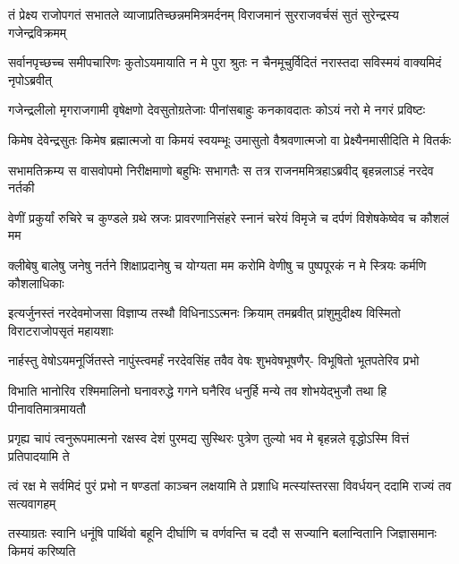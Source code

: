 \fourlineindentedshloka
{तं प्रेक्ष्य राजोपगतं सभातले}
{व्याजाप्रतिच्छन्नममित्रमर्दनम्}
{विराजमानं सुरराजवर्चसं}
{सुतं सुरेन्द्रस्य गजेन्द्रविक्रमम्}


\fourlineindentedshloka
{सर्वानपृच्छच्च समीपचारिणः}
{कुतोऽयमायाति न मे पुरा श्रुतः}
{न चैनमूचुर्विदितं नरास्तदा}
{सविस्मयं वाक्यमिदं नृपोऽब्रवीत्}




\fourlineindentedshloka
{गजेन्द्रलीलो मृगराजगामी}
{वृषेक्षणो देवसुतोग्रतेजाः}
{पीनांसबाहुः कनकावदातः}
{कोऽयं नरो मे नगरं प्रविष्टः}


\fourlineindentedshloka
{किमेष देवेन्द्रसुतः किमेष}
{ब्रह्मात्मजो वा किमयं स्वयम्भूः}
{उमासुतो वैश्रवणात्मजो वा}
{प्रेक्ष्यैनमासीदिति मे वितर्कः}



\fourlineindentedshloka
{सभामतिक्रम्य स वासवोपमो}
{निरीक्षमाणो बहुभिः सभागतैः}
{स तत्र राजनममित्रहाऽब्रवीद्}
{बृहन्नलाऽहं नरदेव नर्तकी}


\fourlineindentedshloka
{वेणीं प्रकुर्यां रुचिरे च कुण्डले}
{ग्रथे स्रजः प्रावरणानिसंहरे}
{स्नानं चरेयं विमृजे च दर्पणं}
{विशेषकेष्वेव च कौशलं मम}


\fourlineindentedshloka
{क्लीबेषु बालेषु जनेषु नर्तने}
{शिक्षाप्रदानेषु च योग्यता मम}
{करोमि वेणीषु च पुष्पपूरकं}
{न मे स्त्रियः कर्मणि कौशलाधिकाः}


\fourlineindentedshloka
{इत्यर्जुनस्तं नरदेवमोजसा}
{विज्ञाप्य तस्थौ विधिनाऽऽत्मनः क्रियाम्}
{तमब्रवीत् प्रांशुमुदीक्ष्य विस्मितो}
{विराटराजोपसृतं महायशाः}


\fourlineindentedshloka
{नार्हस्तु वेषोऽयमनूर्जितस्ते}
{नापुंस्त्वमर्हं नरदेवसिंह}
{तवैव वेषः शुभवेषभूषणैर्-}
{विभूषितो भूतपतेरिव प्रभो}


\fourlineindentedshloka
{विभाति भानोरिव रश्मिमालिनो}
{घनावरुद्धे गगने घनैरिव}
{धनुर्हि मन्ये तव शोभयेद्भुजौ}
{तथा हि पीनावतिमात्रमायतौ}


\fourlineindentedshloka
{प्रगृह्य चापं त्वनुरूपमात्मनो}
{रक्षस्व देशं पुरमद्य सुस्थिरः}
{पुत्रेण तुल्यो भव मे बृहन्नले}
{वृद्धोऽस्मि वित्तं प्रतिपादयामि ते}


\fourlineindentedshloka
{त्वं रक्ष मे सर्वमिदं पुरं प्रभो}
{न षण्डतां काञ्चन लक्षयामि ते}
{प्रशाधि मत्स्यांस्तरसा विवर्धयन्}
{ददामि राज्यं तव सत्यवागहम्}



\fourlineindentedshloka
{तस्याग्रतः स्वानि धनूंषि पार्थिवो}
{बहूनि दीर्घाणि च वर्णवन्ति च}
{ददौ स सज्यानि बलान्वितानि}
{जिज्ञासमानः किमयं करिष्यति}


